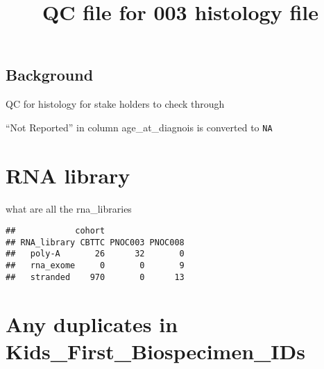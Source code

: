\documentclass[]{article}
\title{QC file for 003 histology file}
\author{}
\date{\vspace{-2.5em}}
\newenvironment{Shaded}{\begin{snugshade}}{\end{snugshade}}
\newcommand{\KeywordTok}[1]{\textcolor[rgb]{0.13,0.29,0.53}{\textbf{#1}}}
\newcommand{\DecValTok}[1]{\textcolor[rgb]{0.00,0.00,0.81}{#1}}
\newcommand{\StringTok}[1]{\textcolor[rgb]{0.31,0.60,0.02}{#1}}
\newcommand{\OperatorTok}[1]{\textcolor[rgb]{0.81,0.36,0.00}{\textbf{#1}}}
\newcommand{\NormalTok}[1]{#1}
\begin{document}
\maketitle

\subsection{Background}\label{background}

QC for histology for stake holders to check through

``Not Reported'' in column age\_at\_diagnois is converted to \texttt{NA}

\section{RNA library}\label{rna-library}

what are all the rna\_libraries

\begin{Shaded}
\end{Shaded}

\begin{verbatim}
##            cohort
## RNA_library CBTTC PNOC003 PNOC008
##   poly-A       26      32       0
##   rna_exome     0       0       9
##   stranded    970       0      13
\end{verbatim}

\section{Any duplicates in
Kids\_First\_Biospecimen\_IDs}\label{any-duplicates-in-kids_first_biospecimen_ids}

\begin{Shaded}
\end{Shaded}
\end{document}
